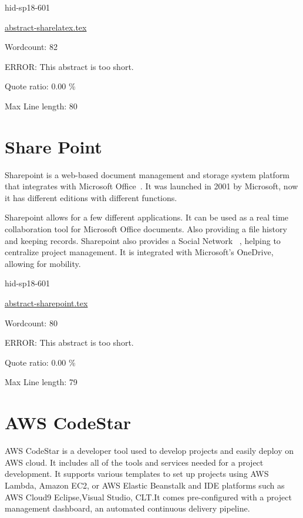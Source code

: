 \begin{IU}

hid-sp18-601

\href{https://github.com/cloudmesh-community/hid-sp18-601/blob/master//technology/abstract-sharelatex.tex}{abstract-sharelatex.tex}

 

Wordcount: 82

ERROR: This abstract is too short.


Quote ratio: 0.00 \%
 
Max Line length: 80
\end{IU}

\section{Share Point}

Sharepoint is a web-based document management and storage system platform that 
integrates with Microsoft Office~\cite{hid-sp18-601-www-spoint-website}. It was
 launched in 2001 by Microsoft, now it 
has different editions with different functions.

Sharepoint allows for a few different applications. It can be used as a real 
time collaboration tool for Microsoft Office documents. Also providing a 
file history and keeping records. Sharepoint also provides a Social Network 
~\cite{hid-sp18-601-www-spoint-new-sharepoint}, 
helping to centralize project management. It is integrated with Microsoft's 
OneDrive, allowing for mobility.

\begin{IU}

hid-sp18-601

\href{https://github.com/cloudmesh-community/hid-sp18-601/blob/master//technology/abstract-sharepoint.tex}{abstract-sharepoint.tex}

 

Wordcount: 80

ERROR: This abstract is too short.


Quote ratio: 0.00 \%
 
Max Line length: 79
\end{IU}

\section{AWS CodeStar}

AWS CodeStar is a developer tool used to develop projects and easily deploy on 
AWS cloud. It includes all of the tools and services needed for a project development.    
It supports various templates to set up projects using AWS Lambda, Amazon EC2, or AWS Elastic Beanstalk 
and IDE platforms such as AWS Cloud9 Eclipse,Visual Studio, CLT.It comes pre-configured with a 
project management dashboard, an automated continuous delivery pipeline.  

